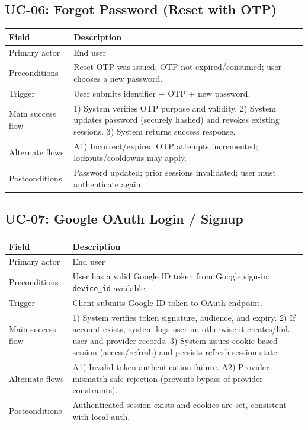 \documentclass[11pt]{article}
\begin{document}
    \subsection{UC-06: Forgot Password (Reset with OTP)}
    \begin{tabularx}{\textwidth}{@{}lX@{}}
\toprule
\textbf{Field} & \textbf{Description} \\
\midrule
Primary actor & End user \\
Preconditions & Reset OTP was issued; OTP not expired/consumed; user chooses a new password. \\
Trigger & User submits identifier + OTP + new password. \\
Main success flow &
1) System verifies OTP purpose and validity. 2) System updates password (securely hashed) and revokes existing sessions. 3) System returns success response. \\
Alternate flows & A1) Incorrect/expired OTP \textrightarrow{} attempts incremented; lockouts/cooldowns may apply. \\
Postconditions & Password updated; prior sessions invalidated; user must authenticate again. \\
\bottomrule
    \end{tabularx}

    \subsection{UC-07: Google OAuth Login / Signup}
    \begin{tabularx}{\textwidth}{@{}lX@{}}
\toprule
\textbf{Field} & \textbf{Description} \\
\midrule
Primary actor & End user \\
Preconditions & User has a valid Google ID token from Google sign-in; \texttt{device\_id} available. \\
Trigger & Client submits Google ID token to OAuth endpoint. \\
Main success flow &
1) System verifies token signature, audience, and expiry. 2) If account exists, system logs user in; otherwise it creates/link user and provider records. 3) System issues cookie-based session (access/refresh) and persists refresh-session state. \\
Alternate flows & A1) Invalid token \textrightarrow{} authentication failure. A2) Provider mismatch \textrightarrow{} safe rejection (prevents bypass of provider constraints). \\
Postconditions & Authenticated session exists and cookies are set, consistent with local auth. \\
\bottomrule
    \end{tabularx}
\end{document}

